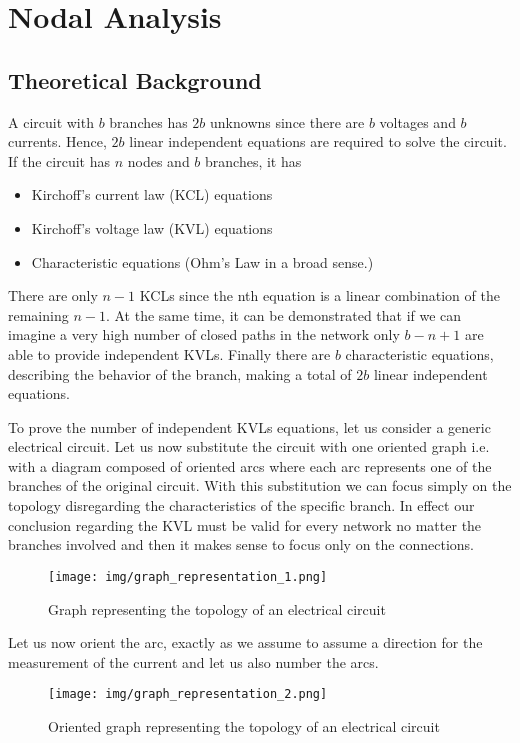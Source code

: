 \chapter{Nodal Analysis}

\section{Theoretical Background}
A circuit with $b$ branches has $2b$ unknowns since there are $b$ voltages and $b$ currents. Hence, $2b$ linear independent equations are required to solve the circuit. If the circuit has $n$ nodes and $b$ branches, it has
\begin{itemize}
 \item Kirchoff's current law (KCL) equations
 \item Kirchoff's voltage law (KVL) equations
 \item Characteristic equations (Ohm's Law in a broad sense.)
\end{itemize}  
There are only $n-1$ KCLs since the nth equation is a linear combination of the remaining $n-1$. At the same time, it can be demonstrated that if we can imagine a very high number of
closed paths in the network only $b-n+1$ are able to provide independent KVLs. Finally there are $b$ characteristic equations, describing the behavior of the branch, making a total of $2b$ linear independent equations.

To prove the number of independent KVLs equations, let us consider a generic electrical circuit. Let us now substitute the circuit with one oriented graph i.e. with a diagram composed of oriented arcs where each arc represents one of the branches of the original circuit.
With this substitution we can focus simply on the topology disregarding the characteristics of the specific branch. In effect our conclusion regarding the KVL must be valid for every network no matter the branches involved and then it makes sense to focus
only on the connections.

\begin{figure}[ht]
	\centering
	\texttt{[image: img/graph\_representation\_1.png]} 
	\caption{Graph representing the topology of an electrical circuit}
	\label{fig:graph_rep_1}
\end{figure}

Let us now orient the arc, exactly as we assume to assume a direction for the measurement of the current and let us also number the arcs.

\begin{figure}[ht]
	\centering
	\texttt{[image: img/graph\_representation\_2.png]} 
	\caption{Oriented graph representing the topology of an electrical circuit}
	\label{fig:graph_rep_2}
\end{figure}

